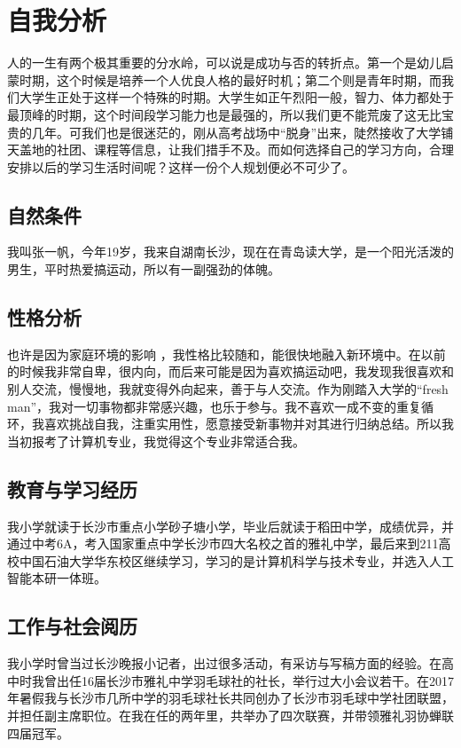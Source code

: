\documentclass{article}
\begin{document}
\thispagestyle{empty}
\newpage
\setcounter{page}{1}
\section{自我分析}
	人的一生有两个极其重要的分水岭，可以说是成功与否的转折点。第一个是幼儿启蒙时期，这个时候是培养一个人优良人格的最好时机；第二个则是青年时期，而我们大学生正处于这样一个特殊的时期。大学生如正午烈阳一般，智力、体力都处于最顶峰的时期，这个时间段学习能力也是最强的，所以我们更不能荒废了这无比宝贵的几年。可我们也是很迷茫的，刚从高考战场中“脱身”出来，陡然接收了大学铺天盖地的社团、课程等信息，让我们措手不及。而如何选择自己的学习方向，合理安排以后的学习生活时间呢？这样一份个人规划便必不可少了。\par
\subsection{自然条件}
我叫张一帆，今年19岁，我来自湖南长沙，现在在青岛读大学，是一个阳光活泼的男生，平时热爱搞运动，所以有一副强劲的体魄。\par
\subsection{性格分析}
也许是因为家庭环境的影响 ，我性格比较随和，能很快地融入新环境中。在以前的时候我非常自卑，很内向，而后来可能是因为喜欢搞运动吧，我发现我很喜欢和别人交流，慢慢地，我就变得外向起来，善于与人交流。作为刚踏入大学的“fresh man”，我对一切事物都非常感兴趣，也乐于参与。我不喜欢一成不变的重复循环，我喜欢挑战自我，注重实用性，愿意接受新事物并对其进行归纳总结。所以我当初报考了计算机专业，我觉得这个专业非常适合我。\par
\subsection{教育与学习经历}
我小学就读于长沙市重点小学砂子塘小学，毕业后就读于稻田中学，成绩优异，并通过中考6A，考入国家重点中学长沙市四大名校之首的雅礼中学，最后来到211高校中国石油大学华东校区继续学习，学习的是计算机科学与技术专业，并选入人工智能本研一体班。\par
\subsection{工作与社会阅历}
我小学时曾当过长沙晚报小记者，出过很多活动，有采访与写稿方面的经验。在高中时我曾出任16届长沙市雅礼中学羽毛球社的社长，举行过大小会议若干。在2017年暑假我与长沙市几所中学的羽毛球社长共同创办了长沙市羽毛球中学社团联盟，并担任副主席职位。在我在任的两年里，共举办了四次联赛，并带领雅礼羽协蝉联四届冠军。\par
\end{document}
